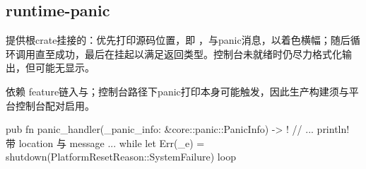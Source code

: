 
\subsection{runtime-panic}

提供根crate挂接的：优先打印源码位置，即 ，与panic消息，以着色横幅；随后循环调用直至成功，最后在挂起以满足\code{!}返回类型。控制台未就绪时仍尽力格式化输出，但可能无显示。

依赖 feature链入与；控制台路径下panic打印本身可能触发，因此生产构建须与平台控制台配对启用。

\begin{rustcode}
pub fn panic_handler(_panic_info: &core::panic::PanicInfo) -> ! {
    // ... println! 带 location 与 message ...
    while let Err(_e) = shutdown(PlatformResetReason::SystemFailure) {}
    loop {}
}
\end{rustcode}
